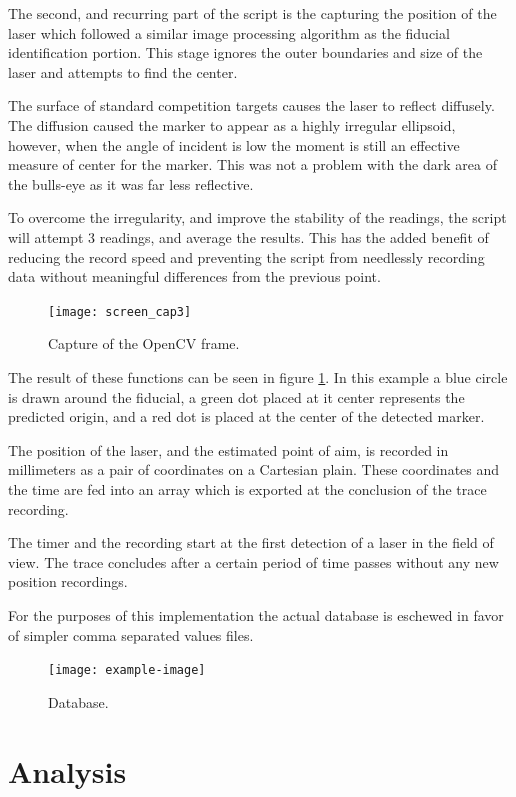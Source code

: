 \documentclass[conference]{IEEEtran}
\begin{document}
The second, and recurring part of the script is the capturing the position of the laser which followed a similar image processing algorithm as the fiducial identification portion.
This stage ignores the outer boundaries and size of the laser and attempts to find the center.

The surface of standard competition targets causes the laser to reflect diffusely.
The diffusion caused the marker to appear as a highly irregular ellipsoid,
however, when the angle of incident is low the moment is still an effective measure of center for the marker.
This was not a problem with the dark area of the bulls-eye as it was far less reflective.

To overcome the irregularity, and improve the stability of the readings, the script will attempt 3 readings, and average the results.
This has the added benefit of reducing the record speed and preventing the script from needlessly recording data without meaningful differences from the previous point.

\begin{figure}[]
	\centering
	\texttt{[image: screen\_cap3]}
	\caption{Capture of the OpenCV frame.}
	\label{fig:screen_cap}
\end{figure}

The result of these functions can be seen in figure \ref{fig:screen_cap}.
In this example a blue circle is drawn around the fiducial,
a green dot placed at it center represents the predicted origin, and
a red dot is placed at the center of the detected marker.

The position of the laser, and the estimated point of aim, is recorded in millimeters as a pair of coordinates on a Cartesian plain. 
These coordinates and the time are fed into an array which is exported at the conclusion of the trace recording.

The timer and the recording start at the first detection of a laser in the field of view.
The trace concludes after a certain period of time passes without any new position recordings.

For the purposes of this implementation the actual database is eschewed in favor of simpler comma separated values files.

\begin{figure}[]
	\centering
	\texttt{[image: example-image]}
	\caption{Database.}
	\label{fig:database}
\end{figure}


\section{Analysis}
\end{document}
